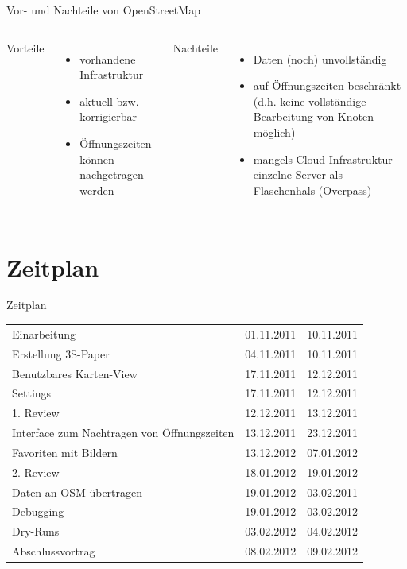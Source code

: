 \documentclass[hyperref]{beamer}
\begin{document}
\begin{frame}{Vor- und Nachteile von OpenStreetMap}
	\begin{columns}
		\column{5.1cm}
		Vorteile
		\begin{itemize}
			\item vorhandene Infrastruktur
			\item aktuell bzw. korrigierbar
			\item Öffnungszeiten können nachgetragen werden \phantom{~~~~~~~~~~~~~~}
		\end{itemize}		
		\column{6cm}
		Nachteile
		\begin{itemize}
			\item Daten (noch) unvollständig
			\item auf Öffnungszeiten beschränkt (d.h. keine vollständige Bearbeitung von Knoten möglich)
                        \item mangels Cloud-Infrastruktur einzelne Server als Flaschenhals (Overpass)
		\end{itemize}
	\end{columns}
\end{frame}

\section{Zeitplan}



\begin{frame}{Zeitplan}

		\begin{tabular}{l l l}
			Einarbeitung & 01.11.2011 & 10.11.2011\\
			Erstellung 3S-Paper & 04.11.2011 & 10.11.2011\\
			Benutzbares Karten-View & 17.11.2011 & 12.12.2011\\
			Settings & 17.11.2011 & 12.12.2011 \\
			1. Review & 12.12.2011 & 13.12.2011\\
			Interface zum Nachtragen von Öffnungszeiten & 13.12.2011 & 23.12.2011\\
			Favoriten mit Bildern & 13.12.2012 & 07.01.2012\\
			2. Review & 18.01.2012 & 19.01.2012\\
			Daten an OSM übertragen & 19.01.2012 & 03.02.2011\\
			Debugging & 19.01.2012 & 03.02.2012\\
			Dry-Runs & 03.02.2012 & 04.02.2012\\
			Abschlussvortrag & 08.02.2012 & 09.02.2012\\
		\end{tabular}

\end{frame}
\end{document}
